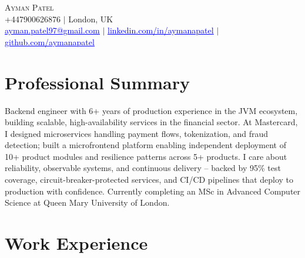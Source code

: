 \documentclass[letterpaper,11pt]{article}
\newcommand{\headerLink}[2]{\href{#1}{\textcolor{blue}{\underline{#2}}}}
\begin{document}
    \begin{center}
        {\Huge\scshape Ayman Patel}
        \\ +447900626876 $|$ London, UK\\
        \small
        \headerLink{mailto:ayman.patel97@gmail.com}{ayman.patel97@gmail.com} $|$
        \headerLink{https://linkedin.com/in/aymanapatel}{linkedin.com/in/aymanapatel} $|$
        \headerLink{https://github.com/aymanapatel}{github.com/aymanapatel}
    \end{center}

\section{Professional Summary}
\small{
Backend engineer with 6+ years of production experience in the JVM ecosystem, building scalable, high-availability services in the financial sector. At Mastercard, I designed microservices handling payment flows, tokenization, and fraud detection; built a microfrontend platform enabling independent deployment of 10+ product modules and resilience patterns across 5+ products. I care about reliability, observable systems, and continuous delivery -- backed by 95\% test coverage, circuit-breaker-protected services, and CI/CD pipelines that deploy to production with confidence. Currently completing an MSc in Advanced Computer Science at Queen Mary University of London.
}
\vspace{0pt}



\section{Work Experience}
\end{document}
